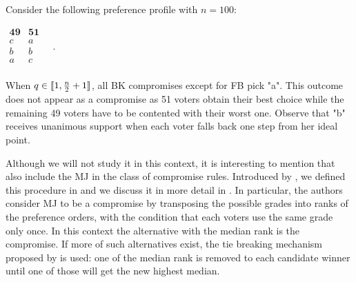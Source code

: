 \begin{example}
	\label{ex:CompromiseGEQ3}
	Consider the following preference profile with $n=100$:
	\begin{center}
		$
		\begin{array}{cc}
			\mathbf{49} & \mathbf{51} \\
			c	&	a	\\
			b	&	b	\\
			a	&	c	\\
		\end{array} \quad.
		$
	\end{center}
	When $q\in \llbracket1,\frac{n}{2}+1\rrbracket $, all BK compromises except for \acl{FB} pick "a". This outcome does not appear as a compromise as 51 voters obtain their best choice while the remaining 49 voters have to be contented with their worst one. Observe that "b" receives unanimous support when each voter falls back one step from her ideal point.
\end{example}

Although we will not study it in this context, it is interesting to mention that \citet{Merlin2019} also include the \acl{MJ} in the class of compromise rules. Introduced by \citet{Balinski2007,Balinski2011}, we defined this procedure in  and we discuss it in more detail in . In particular, the authors consider \acs{MJ} to be a compromise by transposing the possible grades into ranks of the preference orders, with the condition that each voters use the same grade only once. In this context the alternative with the median rank is the compromise. If more of such alternatives exist, the tie breaking mechanism proposed by \citet{Balinski2011} is used: one of the median rank is removed to each candidate winner until one of those will get the new highest median.

